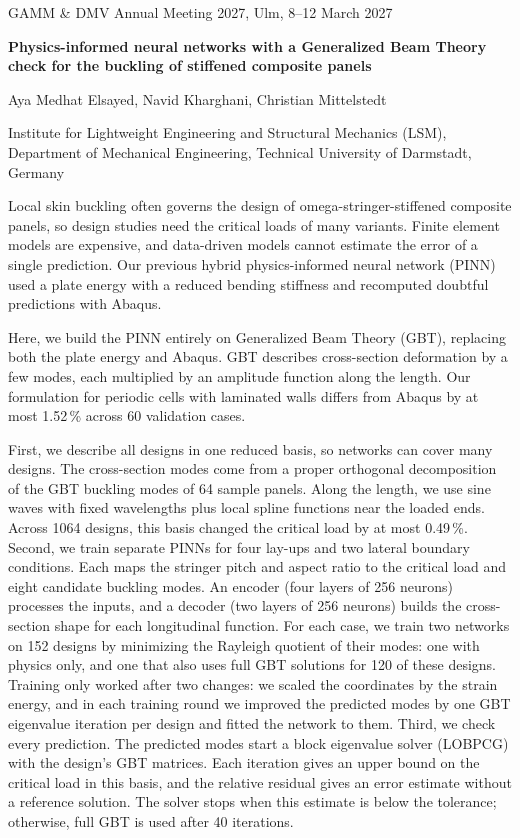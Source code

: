\documentclass[11pt,a4paper]{article}
\begin{document}
{\small\color{muted} GAMM \& DMV Annual Meeting 2027, Ulm, 8--12 March 2027 }\par\vspace{1.4em}
{\raggedright\Large\bfseries Physics-informed neural networks with a Generalized Beam Theory check for the buckling of stiffened composite panels\par}
\vspace{1em}
Aya Medhat Elsayed, Navid Kharghani, Christian Mittelstedt\par
\vspace{0.2em}
{\small Institute for Lightweight Engineering and Structural Mechanics (LSM), Department of Mechanical Engineering, Technical University of Darmstadt, Germany\par}
\vspace{1.2em}
Local skin buckling often governs the design of omega-stringer-stiffened composite panels, so design studies need the critical loads of many variants. Finite element models are expensive, and data-driven models cannot estimate the error of a single prediction. Our previous hybrid physics-informed neural network (PINN) used a plate energy with a reduced bending stiffness and recomputed doubtful predictions with Abaqus.

Here, we build the PINN entirely on Generalized Beam Theory (GBT), replacing both the plate energy and Abaqus. GBT describes cross-section deformation by a few modes, each multiplied by an amplitude function along the length. Our formulation for periodic cells with laminated walls differs from Abaqus by at most 1.52\,\% across 60 validation cases.

First, we describe all designs in one reduced basis, so networks can cover many designs. The cross-section modes come from a proper orthogonal decomposition of the GBT buckling modes of 64 sample panels. Along the length, we use sine waves with fixed wavelengths plus local spline functions near the loaded ends. Across 1064 designs, this basis changed the critical load by at most 0.49\,\%. Second, we train separate PINNs for four lay-ups and two lateral boundary conditions. Each maps the stringer pitch and aspect ratio to the critical load and eight candidate buckling modes. An encoder (four layers of 256 neurons) processes the inputs, and a decoder (two layers of 256 neurons) builds the cross-section shape for each longitudinal function. For each case, we train two networks on 152 designs by minimizing the Rayleigh quotient of their modes: one with physics only, and one that also uses full GBT solutions for 120 of these designs. Training only worked after two changes: we scaled the coordinates by the strain energy, and in each training round we improved the predicted modes by one GBT eigenvalue iteration per design and fitted the network to them. Third, we check every prediction. The predicted modes start a block eigenvalue solver (LOBPCG) with the design's GBT matrices. Each iteration gives an upper bound on the critical load in this basis, and the relative residual gives an error estimate without a reference solution. The solver stops when this estimate is below the tolerance; otherwise, full GBT is used after 40 iterations.
\end{document}

